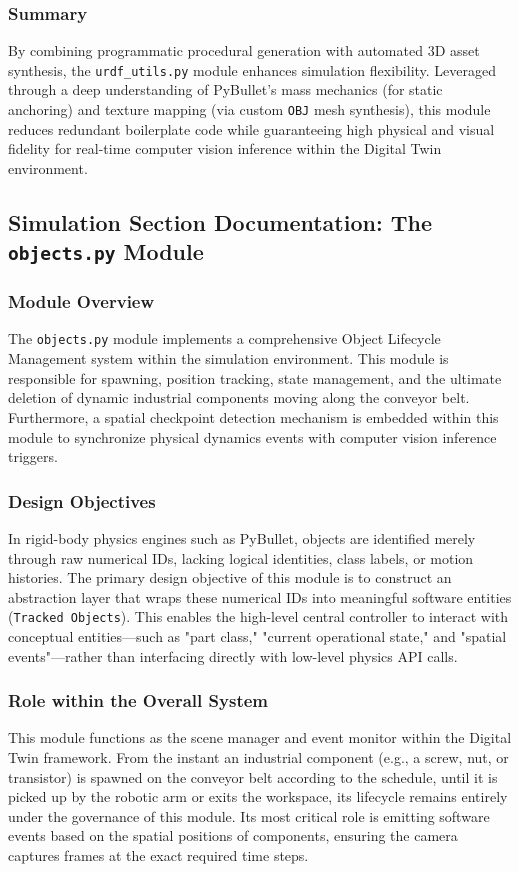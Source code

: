 \documentclass{article}
\begin{document}
\subsubsection{Summary}
By combining programmatic procedural generation with automated 3D asset synthesis, the \texttt{urdf\_utils.py} module enhances simulation flexibility. Leveraged through a deep understanding of PyBullet's mass mechanics (for static anchoring) and texture mapping (via custom \texttt{OBJ} mesh synthesis), this module reduces redundant boilerplate code while guaranteeing high physical and visual fidelity for real-time computer vision inference within the Digital Twin environment.


\subsection{Simulation Section Documentation: The \texttt{objects.py} Module}

\subsubsection{Module Overview}
The \texttt{objects.py} module implements a comprehensive Object Lifecycle Management system within the simulation environment. This module is responsible for spawning, position tracking, state management, and the ultimate deletion of dynamic industrial components moving along the conveyor belt. Furthermore, a spatial checkpoint detection mechanism is embedded within this module to synchronize physical dynamics events with computer vision inference triggers.

\subsubsection{Design Objectives}
In rigid-body physics engines such as PyBullet, objects are identified merely through raw numerical IDs, lacking logical identities, class labels, or motion histories. The primary design objective of this module is to construct an abstraction layer that wraps these numerical IDs into meaningful software entities (\texttt{Tracked Objects}). This enables the high-level central controller to interact with conceptual entities—such as "part class," "current operational state," and "spatial events"—rather than interfacing directly with low-level physics API calls.

\subsubsection{Role within the Overall System}
This module functions as the scene manager and event monitor within the Digital Twin framework. From the instant an industrial component (e.g., a screw, nut, or transistor) is spawned on the conveyor belt according to the schedule, until it is picked up by the robotic arm or exits the workspace, its lifecycle remains entirely under the governance of this module. Its most critical role is emitting software events based on the spatial positions of components, ensuring the camera captures frames at the exact required time steps.
\end{document}
